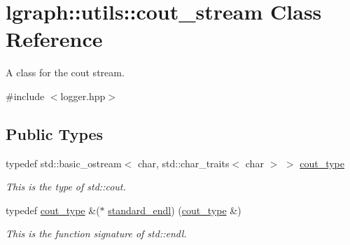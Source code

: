\hypertarget{classlgraph_1_1utils_1_1cout__stream}{}\section{lgraph\+:\+:utils\+:\+:cout\+\_\+stream Class Reference}
\label{classlgraph_1_1utils_1_1cout__stream}


A class for the cout stream.  




{\ttfamily \#include $<$logger.\+hpp$>$}

\subsection*{Public Types}
\begin{DoxyCompactItemize}
\item 
\mbox{\label{classlgraph_1_1utils_1_1cout__stream_a567e84e8f695f9f06e25a90385bd36bc}} 
typedef std\+::basic\+\_\+ostream$<$ char, std\+::char\+\_\+traits$<$ char $>$ $>$ \hyperlink{classlgraph_1_1utils_1_1cout__stream_a567e84e8f695f9f06e25a90385bd36bc}{cout\+\_\+type}
\begin{DoxyCompactList}\small\item\em This is the type of std\+::cout. \end{DoxyCompactList}\item 
\mbox{\label{classlgraph_1_1utils_1_1cout__stream_a3dc3129e1e5c26c370223e29dbdefe75}} 
typedef \hyperlink{classlgraph_1_1utils_1_1cout__stream_a567e84e8f695f9f06e25a90385bd36bc}{cout\+\_\+type} \&($\ast$ \hyperlink{classlgraph_1_1utils_1_1cout__stream_a3dc3129e1e5c26c370223e29dbdefe75}{standard\+\_\+endl}) (\hyperlink{classlgraph_1_1utils_1_1cout__stream_a567e84e8f695f9f06e25a90385bd36bc}{cout\+\_\+type} \&)
\begin{DoxyCompactList}\small\item\em This is the function signature of std\+::endl. \end{DoxyCompactList}\end{DoxyCompactItemize}
